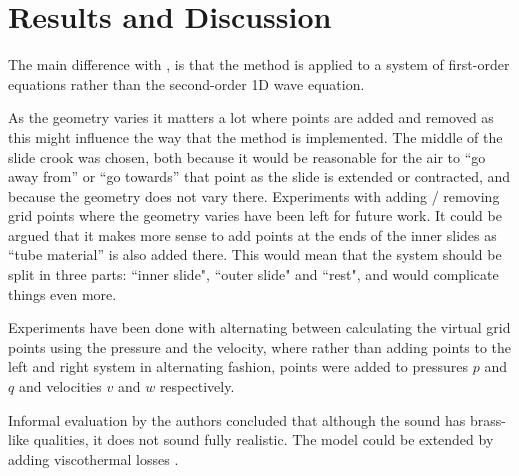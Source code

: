 \section{Results and Discussion}\label{sec:resDisc}
The main difference with \cite{Willemsen2021}, is that the method is applied to a system of first-order equations rather than the second-order 1D wave equation.

 As the geometry varies it matters a lot where points are added and removed as this might influence the way that the method is implemented. The middle of the slide crook was chosen, both because it would be reasonable for the air to ``go away from'' or ``go towards'' that point as the slide is extended or contracted, and because the geometry does not vary there. Experiments with adding / removing grid points where the geometry varies have been left for future work.  It could be argued that it makes more sense to add points at the ends of the inner slides as ``tube material'' is also added there. This would mean that the system should be split in three parts: ``inner slide", ``outer slide" and ``rest", and would complicate things even more.


Experiments have been done with alternating between calculating the virtual grid points using the pressure and the velocity, where rather than adding points to the left and right system in alternating fashion, points were added to pressures $p$ and $q$ and velocities $v$ and $w$ respectively.


Informal evaluation by the authors concluded that although the sound has brass-like qualities, it does not sound fully realistic. The model could be extended by adding viscothermal losses \cite{HarissonJASA}.
